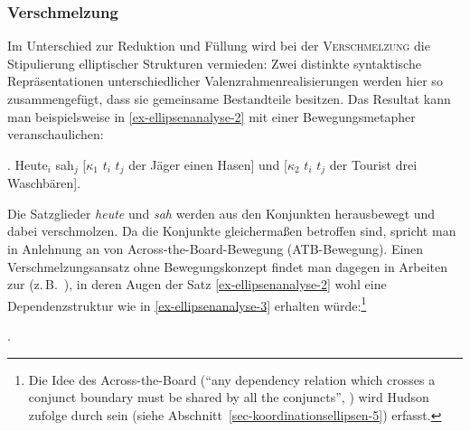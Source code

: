 \subsubsection*{Verschmelzung}

Im Unterschied zur Reduktion und Füllung wird bei der \textsc{Verschmelzung} die Stipulierung elliptischer Strukturen vermieden: Zwei distinkte syntaktische Repräsentationen unterschiedlicher Valenzrahmenrealisierungen werden hier so zusammengefügt, dass sie gemeinsame Bestandteile besitzen. Das Resultat kann man beispielsweise in \ref{ex-ellipsenanalyse-2} mit einer Bewegungsmetapher veranschaulichen: 

\ex. \label{ex-ellipsenanalyse-2} Heute$_i$ sah$_j$ [$\kappa_1$ $t_i$ $t_j$ der Jäger einen Hasen] und [$\kappa_2$ $t_i$ $t_j$ der Tourist drei Waschbären]. 

\largerpage%
Die Satzglieder {\it heute} und {\it sah} werden aus den Konjunkten herausbewegt und dabei verschmolzen. Da die Konjunkte gleicherma\ss en betroffen sind, spricht man in Anlehnung an \cite{Williams:78,Williams:81} von Across-the-Board-Bewegung (ATB-Bewegung). Einen Verschmelzungsansatz ohne Bewegungskonzept findet man dagegen in Arbeiten zur  (z.\,B.\ \citealt{Hudson:88,Pickering:Barry:93}), in deren Augen der Satz \ref{ex-ellipsenanalyse-2} wohl eine Dependenzstruktur wie in \ref{ex-ellipsenanalyse-3} erhalten würde:\footnote{Die Idee des Across-the-Board ("`any dependency relation which crosses a conjunct boundary must be shared by all the conjuncts"', \citealt[323]{Hudson:88}) wird Hudson zufolge durch sein  (siehe Abschnitt~\ref{sec-koordinationsellipsen-5}) erfasst.}

\vspace{6ex}

\ex. 

